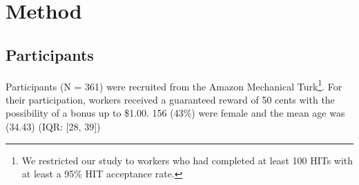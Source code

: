 \documentclass[a4paper,doc,natbib,floatsintext]{apa6}\usepackage[]{graphicx}\usepackage[]{color}
\begin{document}















\section{Method}

\subsection{Participants}

Participants (N = 361) were recruited from the Amazon Mechanical Turk\footnote{We restricted our study to workers who had completed at least 100 HITs with at least a 95\% HIT acceptance rate.}. For their participation, workers received a guaranteed reward of 50 cents with the possibility of a bonus up to \$1.00. 156 (43\%) were female and the mean age was (34.43) (IQR: [28, 39])
\end{document}
